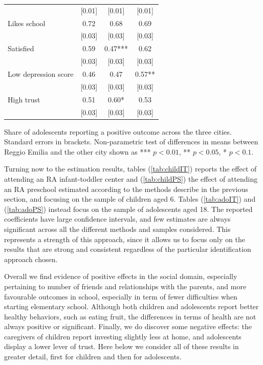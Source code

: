 \documentclass[12pt]{article}
\begin{document}
\begin{table}[ht]
\begin{tabular}{lccc}
& [0.01] & [0.01] & [0.01] \\ 
Likes school & 0.72 & 0.68 & 0.69 \\ 
& [0.03] & [0.03] & [0.03] \\ 
Satisfied & 0.59 & 0.47*** & 0.62 \\ 
& [0.03] & [0.03] & [0.03] \\ 
Low depression score & 0.46 & 0.47 & 0.57** \\ 
& [0.03] & [0.03] & [0.03] \\ 
High trust & 0.51 & 0.60* & 0.53 \\ 
& [0.03] & [0.03] & [0.03] \\ \hline
\end{tabular}%
{\footnotesize \raggedright{Share of adolescents reporting a positive
outcome across the three cities. Standard errors in brackets. Non-parametric
test of differences in means between Reggio Emilia and the other city shown
as *** $p<0.01$, ** $p<0.05$, * $p<0.1$.} }
\end{table}

Turning now to the estimation results, tables (\ref{tab:childIT}) reports
the effect of attending an RA infant-toddler center and (\ref{tab:childPS})
the effect of attending an RA preschool estimated according to the methods
describe in the previous section, and focusing on the sample of children
aged 6. Tables (\ref{tab:adoIT}) and (\ref{tab:adoPS}) instead focus on the
sample of adolescents aged 18. The reported coefficients have large
confidence intervals, and few estimates are always significant across all
the different methods and samples considered. This represents a strength of
this approach, since it allows us to focus only on the results that are
strong and consistent regardless of the particular identification approach
chosen.

Overall we find evidence of positive effects in the social domain,
especially pertaining to number of friends and relationships with the
parents, and more favourable outcomes in school, especially in term of fewer
difficulties when starting elementary school. Although both children and
adolescents report better healthy behaviors, such as eating fruit, the
differences in terms of health are not always positive or significant.
Finally, we do discover some negative effects: the caregivers of children
report investing slightly less at home, and adolescents display a lower
lever of trust. Here below we consider all of these results in greater
detail, first for children and then for adolescents.
\end{document}
